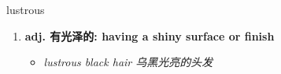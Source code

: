 
\begin{frame}
{\huge lustrous}
\begin{center}
\begin{enumerate}\Large
  \item \textbf{adj. 有光泽的: having a shiny surface or finish}
  \begin{itemize}
    \item \em{\Large{lustrous black hair 乌黑光亮的头发}}
  \end{itemize}
\end{enumerate}
\end{center}
\end{frame}
